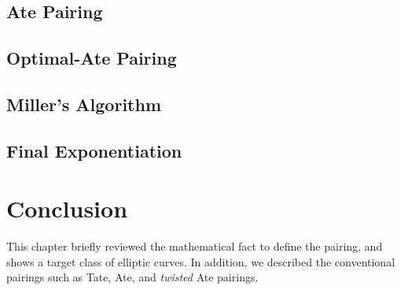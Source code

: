 \subsection{Ate Pairing}

\subsection{Optimal-Ate Pairing}



\subsection{Miller's Algorithm}

	\subsection{Final Exponentiation}
	
	
	
	\section{Conclusion}
	This chapter briefly reviewed the mathematical fact to define the pairing, and shows a target class of elliptic curves.
	In addition, we described the conventional pairings such as Tate, Ate, and {\it twisted} Ate pairings.
	
	


